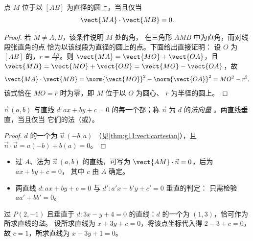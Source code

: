 \begin{proposition}[以已知线段为直径的圆]\label{prop:g11:scal:diameter}
点 $M$ 位于以 $[AB]$ 为直径的圆上，当且仅当
\[
\vect{MA} \cdot \vect{MB} = 0 .
\]
\end{proposition}

\begin{proof}
若 $M \neq A, B$，该条件说明 $M$ 处的角，
在三角形 $AMB$ 中为直角，而对线段张直角的点
恰为以该线段为直径的圆上的点。下面给出直接证明：
设 $O$ 为 $[AB]$ 的，$r = \frac{AB}{2}$。则
$\vect{MA} = \vect{MO} + \vect{OA}$，且
$\vect{MB} = \vect{MO} + \vect{OB} = \vect{MO} - \vect{OA}$，故
\[
\vect{MA}\cdot\vect{MB}
= \norm{\vect{MO}}^2 - \norm{\vect{OA}}^2 = MO^2 - r^2,
\]
该式恰在 $MO = r$ 时为零，即 $M$ 位于以 $O$ 为圆心、
$r$ 为半径的圆上。
\end{proof}

\begin{proposition}[直线的法向量]\label{prop:g11:scal:normal}
 $\vec n\,(a, b)$ 与直线
$d : ax + by + c = 0$ 的每一个都；称 $\vec n$ 为 $d$ 的\emph{法向量}
。两直线垂直，当且仅当
它们的法（或）。
\end{proposition}

\begin{proof}
$d$ 的一个为 $\vec u\,(-b, a)$
（见\cref{thm:g11:vect:cartesian}），且
$\vec n \cdot \vec u = a(-b) + b(a) = 0$。
\end{proof}

\begin{method}[使用法向量]\label{met:g11:scal:normal}
\begin{itemize}
  \item 过 $A$、法为 $\vec n\,(a,b)$ 的直线，可写为
        $\vect{AM} \cdot \vec n = 0$，后为 $ax + by + c = 0$，
        其中 $c$ 由 $A$ 确定。
  \item 两直线 $d: ax+by+c = 0$ 与 $d': a'x+b'y+c' = 0$ 垂直的判定：
        只需检验 $aa' + bb' = 0$。
\end{itemize}
\end{method}

\begin{example}\label{ex:g11:scal:perpline}
过 $P(2, -1)$ 且垂直于 $d : 3x - y + 4 = 0$ 的直线：$d$ 的一个为
$(1, 3)$，恰可作为所求直线的\emph{法}。
设所求直线为 $x + 3y + c = 0$，将该点坐标代入得
$2 - 3 + c = 0$，故 $c = 1$，所求直线为 $x + 3y + 1 = 0$。
\end{example}

